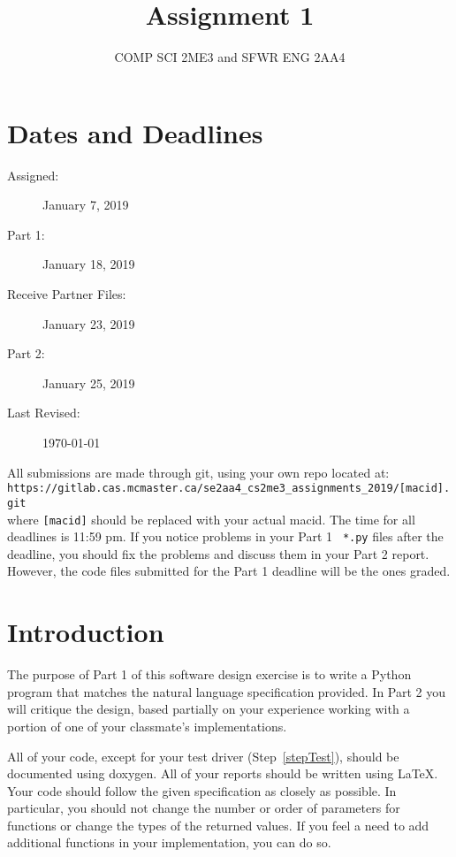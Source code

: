 \documentclass[12pt]{article}
\title{Assignment 1}
\author{COMP SCI 2ME3 and SFWR ENG 2AA4}
\date{}
\newcommand{\latex}{\LaTeX\xspace}
\begin{document}

\maketitle

\section{Dates and Deadlines}

\begin{description}
\item [Assigned:] January 7, 2019
\item [Part 1:] January 18, 2019
\item [Receive Partner Files:] January 23, 2019
\item [Part 2:] January 25, 2019
\item [Last Revised:] \today
\end{description}

\noindent All submissions are made through git, using your own repo located at:\\

\texttt{https://gitlab.cas.mcmaster.ca/se2aa4\_cs2me3\_assignments\_2019/[macid].git}\\

\noindent where \texttt{[macid]} should be replaced with your actual macid.  The
time for all deadlines is 11:59 pm.  If you notice problems in your Part 1 {\tt
  *.py} files after the deadline, you should fix the problems and discuss them
in your Part 2 report.  However, the code files submitted for the Part 1
deadline will be the ones graded.

\section{Introduction}

The purpose of Part 1 of this software design exercise is to write a Python
program that matches the natural language specification provided.  In Part 2 you
will critique the design, based partially on your experience working with a
portion of one of your classmate's implementations.

All of your code, except for your test driver (Step~\ref{stepTest}), should be
documented using doxygen.  All of your reports should be written using \latex.
Your code should follow the given specification as closely as possible.  In
particular, %
you should not change the number or order of parameters for functions or change
the types of the returned
values.%
If you feel a need to add additional functions in your implementation, you can do so.
\end{document}
